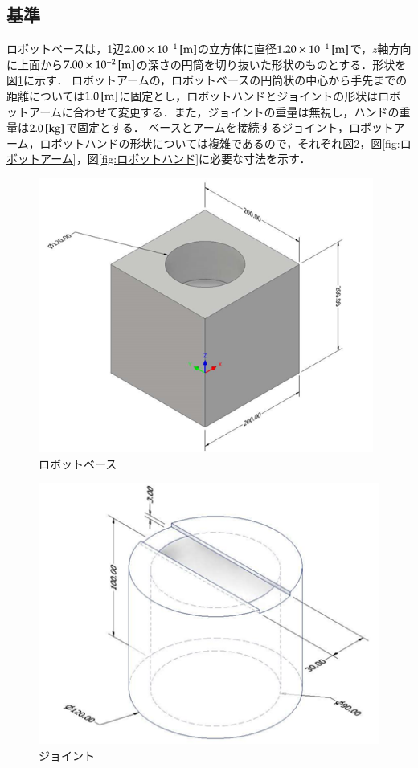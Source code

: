 \documentclass[10pt,b5paper,papersize,dvipdfmx]{jsbook}
\begin{document}
\subsection{基準}\label{基準}
ロボットベースは，1辺$2.00\times10^{-1} \tani*{m}$の立方体に直径$1.20\times10^{-1} \tani*{m}$で，$z$軸方向に上面から$7.00\times10^{-2} \tani*{m}$の深さの円筒を切り抜いた形状のものとする．形状を図\ref{fig:ロボットベース}に示す．
ロボットアームの，ロボットベースの円筒状の中心から手先までの距離については$1.0\tani*{m}$に固定とし，ロボットハンドとジョイントの形状はロボットアームに合わせて変更する．また，ジョイントの重量は無視し，ハンドの重量は$2.0\tani*{kg}$で固定とする．
ベースとアームを接続するジョイント，ロボットアーム，ロボットハンドの形状については複雑であるので，それぞれ図\ref{fig:ジョイント}，図\ref{fig:ロボットアーム}，図\ref{fig:ロボットハンド}に必要な寸法を示す．
\begin{figure}[H]
  \centering
  \includegraphics[width=11cm]{img/robot02.png}
  \caption{ロボットベース}
  \label{fig:ロボットベース}
\end{figure}
\begin{figure}[H]
  \centering
  \includegraphics[width=12cm]{img/robot03.png}
  \caption{ジョイント}
  \label{fig:ジョイント}
\end{figure}
\end{document}
